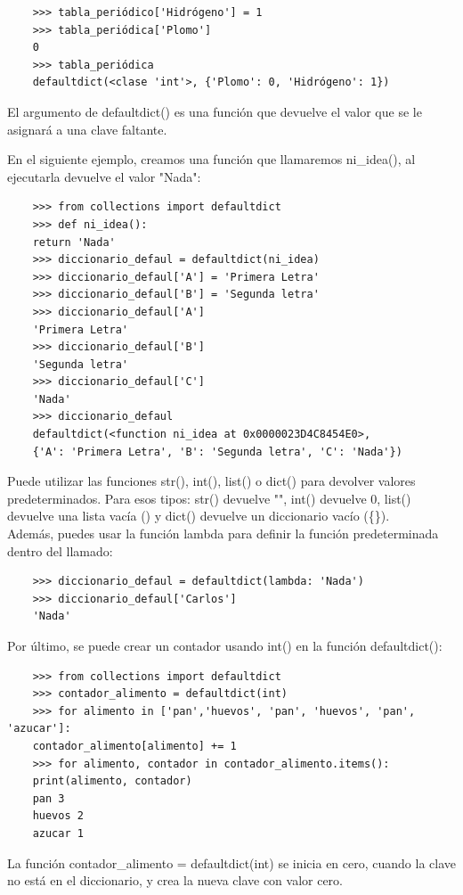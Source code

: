 \begin{lstlisting}
	>>> tabla_periódico['Hidrógeno'] = 1
	>>> tabla_periódica['Plomo']
	0
	>>> tabla_periódica
	defaultdict(<clase 'int'>, {'Plomo': 0, 'Hidrógeno': 1})
\end{lstlisting}

El argumento de {\ttfamily defaultdict()} es una función que devuelve el valor que se le asignará a
una clave faltante. 

En el siguiente ejemplo, creamos una función que llamaremos { \ttfamily ni\_idea()}, al ejecutarla devuelve el valor {}"{}Nada{}"{}:

\begin{lstlisting}
	>>> from collections import defaultdict
	>>> def ni_idea():
	return 'Nada'
	>>> diccionario_defaul = defaultdict(ni_idea)
	>>> diccionario_defaul['A'] = 'Primera Letra'
	>>> diccionario_defaul['B'] = 'Segunda letra'
	>>> diccionario_defaul['A']
	'Primera Letra'
	>>> diccionario_defaul['B']
	'Segunda letra'
	>>> diccionario_defaul['C']
	'Nada'
	>>> diccionario_defaul
	defaultdict(<function ni_idea at 0x0000023D4C8454E0>, 
	{'A': 'Primera Letra', 'B': 'Segunda letra', 'C': 'Nada'})
\end{lstlisting}

Puede utilizar las funciones {\ttfamily str()}, {\ttfamily int()},  {\ttfamily list()} o {\ttfamily dict()} para devolver valores  predeterminados. Para esos tipos: {\ttfamily str()} devuelve {\ttfamily {}"{}"{}}, {\ttfamily int()} devuelve 0,  {\ttfamily list()} devuelve una lista vacía ({\ttfamily []}) y {\ttfamily dict()} devuelve un diccionario vacío ({\ttfamily \{\}}). \\

Además, puedes usar la función {\ttfamily lambda} para definir la función predeterminada dentro del
llamado:

\begin{lstlisting}	
	>>> diccionario_defaul = defaultdict(lambda: 'Nada')
	>>> diccionario_defaul['Carlos']
	'Nada'
\end{lstlisting}

Por último, se puede crear un contador usando {\ttfamily int()} en la función {\ttfamily defaultdict()}:

\begin{lstlisting}
	>>> from collections import defaultdict
	>>> contador_alimento = defaultdict(int)
	>>> for alimento in ['pan','huevos', 'pan', 'huevos', 'pan', 'azucar']:
	contador_alimento[alimento] += 1	
	>>> for alimento, contador in contador_alimento.items():
	print(alimento, contador)
	pan 3
	huevos 2
	azucar 1
\end{lstlisting}
La función  {\ttfamily contador\_alimento = defaultdict(int)} se inicia en cero, cuando la clave no está en el diccionario, y crea la nueva clave con valor cero.

